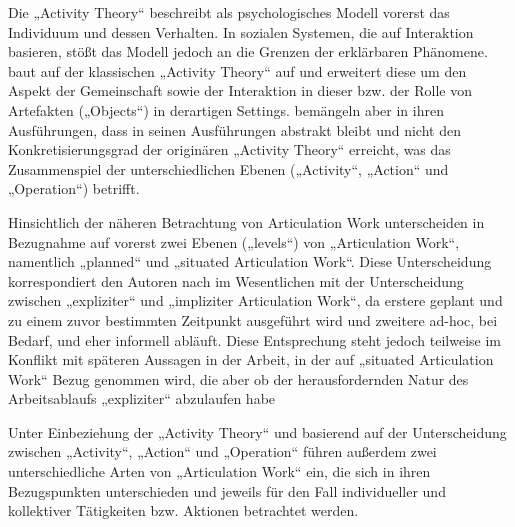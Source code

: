 Die „Activity Theory“ beschreibt als psychologisches Modell vorerst das Individuum und dessen Verhalten. In sozialen Systemen, die auf Interaktion basieren, stößt das Modell jedoch an die Grenzen der erklärbaren Phänomene. \citet{Engestrom87} baut auf der klassischen „Activity Theory“ auf und erweitert diese um den Aspekt der Gemeinschaft sowie der Interaktion in dieser bzw. der Rolle von Artefakten („Objects“) in derartigen Settings. \citet{Fjuk97} bemängeln aber in ihren Ausführungen, dass \citeauthor{Engestrom87} in seinen Ausführungen abstrakt bleibt und nicht den Konkretisierungsgrad der originären „Activity Theory“ erreicht, was das Zusammenspiel der unterschiedlichen Ebenen („Activity“, „Action“ und „Operation“) betrifft.

Hinsichtlich der näheren Betrachtung von Articulation Work unterscheiden \citet{Fjuk97} in Bezugnahme auf \citet{Strauss93} vorerst zwei Ebenen („levels“) von „Articulation Work“, namentlich „planned“ und „situated Articulation Work“. Diese Unterscheidung korrespondiert den Autoren nach im Wesentlichen mit der Unterscheidung zwischen „expliziter“ und „impliziter Articulation Work“, da erstere geplant und zu einem zuvor bestimmten Zeitpunkt ausgeführt wird und zweitere ad-hoc, bei Bedarf, und eher informell abläuft. Diese Entsprechung steht jedoch teilweise im Konflikt mit späteren Aussagen in der Arbeit, in der auf „situated Articulation Work“ Bezug genommen wird, die aber ob der herausfordernden Natur des Arbeitsablaufs „expliziter“ abzulaufen habe \citep[][S. 15]{Fjuk97}

Unter Einbeziehung der „Activity Theory“ und basierend auf der Unterscheidung zwischen „Activity“, „Action“ und „Operation“ führen \citet{Fjuk97} außerdem zwei unterschiedliche Arten von „Articulation Work“ ein, die sich in ihren Bezugspunkten unterschieden und jeweils für den Fall individueller und kollektiver Tätigkeiten bzw. Aktionen betrachtet werden.  

